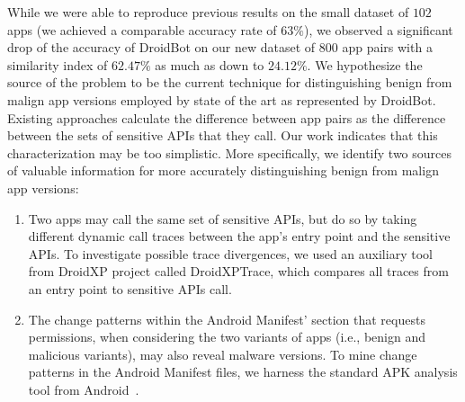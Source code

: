 While we were able to reproduce previous results 
on the small dataset of $102$ apps (we achieved a comparable accuracy rate of $63\%$), 
we observed a significant drop of the accuracy of DroidBot on our new dataset of $800$ 
app pairs with a similarity index of $62.47\%$ as much as down to $24.12\%$.
%
We hypothesize the source of the problem to be the current technique 
for distinguishing benign from malign app versions employed 
by state of the art as represented by
DroidBot. Existing approaches calculate the
difference between app pairs as
the difference between the sets of sensitive APIs 
that they call. Our work indicates that this characterization may be too simplistic.
More specifically, we identify two 
sources of valuable information for more accurately
distinguishing benign from malign app versions:

\begin{enumerate}
    \item Two apps may call the same set of sensitive APIs, but do so by taking different dynamic call traces between the app's entry point and the sensitive APIs. To investigate possible trace divergences, we used an auxiliary tool from DroidXP project called DroidXPTrace, which compares all traces from an entry point to sensitive APIs call.
    \item The {\color{blue}change patterns} within the Android Manifest' section that requests permissions, when considering the two variants of apps (i.e., benign and malicious variants), may also reveal malware versions. To {\color{blue}mine change patterns} in the Android Manifest files, we harness the standard APK analysis tool from Android~\cite{au2011short}. 
\end{enumerate}


